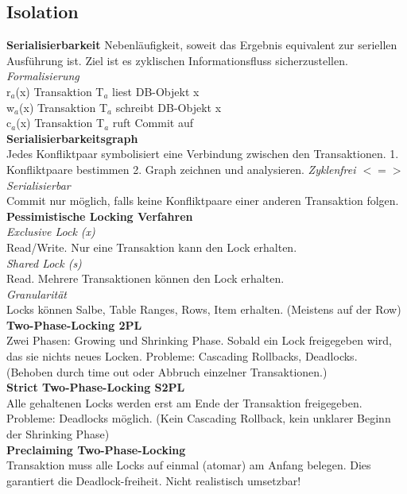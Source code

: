 \documentclass[7pt,landscape,a4paper]{scrartcl}
\begin{document}
\begin{multicols*}{4}
\subsection{Isolation}
\textbf{Serialisierbarkeit} 
Nebenläufigkeit, soweit das Ergebnis equivalent zur seriellen Ausführung ist. Ziel ist es zyklischen Informationsfluss sicherzustellen.\\
\textit{Formalisierung} \\
r$_{a}$(x) Transaktion T$_{a}$ liest DB-Objekt x\\
w$_{a}$(x) Transaktion T$_{a}$ schreibt DB-Objekt x\\
c$_{a}$(x) Transaktion T$_{a}$ ruft Commit auf\\
\textbf{Serialisierbarkeitsgraph}\\
Jedes Konfliktpaar symbolisiert eine Verbindung zwischen den Transaktionen. 1. Konfliktpaare bestimmen 2. Graph zeichnen und analysieren. \textit{Zyklenfrei $<=>$ Serialisierbar}\\
Commit nur möglich, falls keine Konfliktpaare einer anderen Transaktion folgen.\\
\textbf{Pessimistische Locking Verfahren}\\
\textit{Exclusive Lock (x)}\\
Read/Write. Nur eine Transaktion kann den Lock erhalten.\\
\textit{Shared Lock (s)}\\
Read. Mehrere Transaktionen können den Lock erhalten.\\
\textit{Granularität}\\
Locks können Salbe, Table Ranges, Rows, Item erhalten. (Meistens auf der Row)\\
\textbf{Two-Phase-Locking 2PL}\\
Zwei Phasen: Growing und Shrinking Phase. Sobald ein Lock freigegeben wird, das sie nichts neues Locken. Probleme: Cascading Rollbacks, Deadlocks. (Behoben durch time out oder Abbruch einzelner Transaktionen.)\\
\textbf{Strict Two-Phase-Locking S2PL}\\
Alle gehaltenen Locks werden erst am Ende der Transaktion freigegeben.  
Probleme: Deadlocks möglich. (Kein Cascading Rollback, kein unklarer Beginn der Shrinking  Phase)\\
\textbf{Preclaiming Two-Phase-Locking}\\
Transaktion muss alle Locks auf einmal (atomar) am Anfang belegen. Dies garantiert die Deadlock-freiheit. Nicht realistisch umsetzbar!

\end{multicols*}
\end{document}
